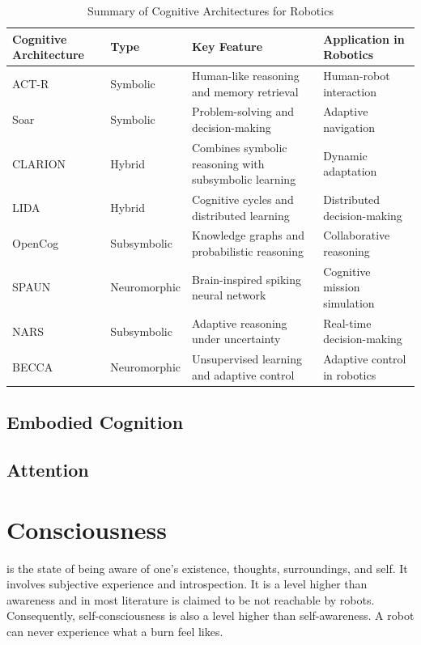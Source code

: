             \begin{table}[h!]
                \centering
                \begin{tabular}{|l|l|l|l|}
                    \hline
                    \textbf{Cognitive Architecture} & \textbf{Type} & \textbf{Key Feature} & \textbf{Application in Robotics} \\ \hline
                    ACT-R & Symbolic & Human-like reasoning and memory retrieval & Human-robot interaction  \\ \hline
                    Soar & Symbolic & Problem-solving and decision-making & Adaptive navigation  \\ \hline
                    CLARION & Hybrid & Combines symbolic reasoning with subsymbolic learning & Dynamic adaptation  \\ \hline
                    LIDA & Hybrid & Cognitive cycles and distributed learning & Distributed decision-making  \\ \hline
                    OpenCog & Subsymbolic & Knowledge graphs and probabilistic reasoning & Collaborative reasoning  \\ \hline
                    SPAUN & Neuromorphic & Brain-inspired spiking neural network & Cognitive mission simulation  \\ \hline
                    NARS & Subsymbolic & Adaptive reasoning under uncertainty & Real-time decision-making  \\ \hline
                    BECCA & Neuromorphic & Unsupervised learning and adaptive control & Adaptive control in robotics  \\ \hline
                \end{tabular}
                \caption{Summary of Cognitive Architectures for Robotics}
            \end{table}




    \subsection{Embodied Cognition}

    \subsection{Attention}



\section{Consciousness} is the state of being aware of one’s existence, thoughts, surroundings, and self. It involves subjective experience and introspection. It is a level higher than awareness and in most literature is claimed to be not reachable by robots. Consequently, self-consciousness is also a level higher than self-awareness. A robot can never experience what a burn feel likes.
